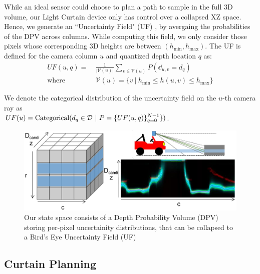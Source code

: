 While an ideal sensor could choose to plan a path to sample in the full 3D volume, our Light Curtain device only has control over a collapsed XZ  space. Hence, we generate an ``Uncertainty Field" (UF) \cite{yang2019inferring}, by avergaing the probabilities of the DPV across columns. While computing this field, we only consider those pixels whose corresponding 3D heights are between $(h_\text{min}, h_\text{max})$. The UF is defined for the camera column $u$ and quantized depth location $q$ as:
\begin{align}
   UF(u, q) =\ &\frac{1}{|\mathcal{V}(u)|}\sum_{v \in \mathcal{V}(u)} P(\dd_{u, v} = d_q)\nonumber\\
   \text{where } &\mathcal{V}(u) = \{v\ |\ h_\text{min} \leq h(u, v) \leq h_\text{max}\} 
   \label{eq:collapse}
\end{align}

We denote the categorical distribution of the uncertainty field on the $u$-th camera ray as \\$UF(u)=\text{Categorical}(d_q \in \D\ |\ P=\{UF(u, q)\}_{q=0}^{N-1}\})$. 

\begin{figure}[h]
   \centering
   \begin{minipage}{0.5\textwidth}
       \centering
       \includegraphics[width=1.0\textwidth]{figures/bev.pdf}
   \end{minipage}\hfill
   \centering
   \caption{Our state space consists of a Depth Probability Volume (DPV) storing per-pixel uncertainity distributions, that can be collapsed to a Bird's Eye Uncertainty Field (UF)}
\end{figure}

\subsection{Curtain Planning}

